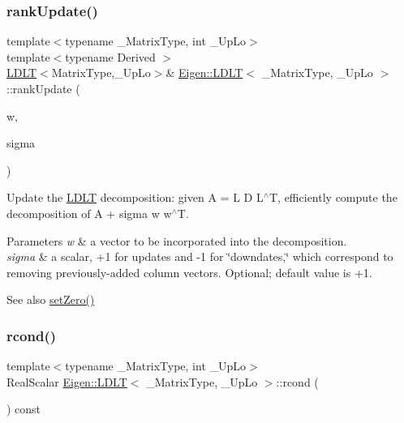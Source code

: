 \subsubsection{\texorpdfstring{rankUpdate()}{rankUpdate()}}
{\footnotesize\ttfamily template$<$typename \+\_\+\+Matrix\+Type, int \+\_\+\+Up\+Lo$>$ \\
template$<$typename Derived $>$ \\
\mbox{\hyperlink{class_eigen_1_1_l_d_l_t}{L\+D\+LT}}$<$Matrix\+Type,\+\_\+\+Up\+Lo$>$\& \mbox{\hyperlink{class_eigen_1_1_l_d_l_t}{Eigen\+::\+L\+D\+LT}}$<$ \+\_\+\+Matrix\+Type, \+\_\+\+Up\+Lo $>$\+::rank\+Update (\begin{DoxyParamCaption}\item[{const \mbox{\hyperlink{class_eigen_1_1_matrix_base}{Matrix\+Base}}$<$ Derived $>$ \&}]{w,  }\item[{const typename \mbox{\hyperlink{class_eigen_1_1_l_d_l_t}{L\+D\+LT}}$<$ Matrix\+Type, \+\_\+\+Up\+Lo $>$\+::Real\+Scalar \&}]{sigma }\end{DoxyParamCaption})}

Update the \mbox{\hyperlink{class_eigen_1_1_l_d_l_t}{L\+D\+LT}} decomposition\+: given A = L D L$^\wedge$T, efficiently compute the decomposition of A + sigma w w$^\wedge$T. 
\begin{DoxyParams}{Parameters}
{\em w} & a vector to be incorporated into the decomposition. \\
\hline
{\em sigma} & a scalar, +1 for updates and -\/1 for \char`\"{}downdates,\char`\"{} which correspond to removing previously-\/added column vectors. Optional; default value is +1. \\
\hline
\end{DoxyParams}
\begin{DoxySeeAlso}{See also}
\mbox{\hyperlink{class_eigen_1_1_l_d_l_t_a776d0ab6c980847297d25b03b5d2216a}{set\+Zero()}} 
\end{DoxySeeAlso}
\mbox{\label{class_eigen_1_1_l_d_l_t_ae646403fdde3a4b18e278a32c61a0953}} 
\subsubsection{\texorpdfstring{rcond()}{rcond()}}
{\footnotesize\ttfamily template$<$typename \+\_\+\+Matrix\+Type, int \+\_\+\+Up\+Lo$>$ \\
Real\+Scalar \mbox{\hyperlink{class_eigen_1_1_l_d_l_t}{Eigen\+::\+L\+D\+LT}}$<$ \+\_\+\+Matrix\+Type, \+\_\+\+Up\+Lo $>$\+::rcond (\begin{DoxyParamCaption}{ }\end{DoxyParamCaption}) const\hspace{0.3cm}{\ttfamily [inline]}}

